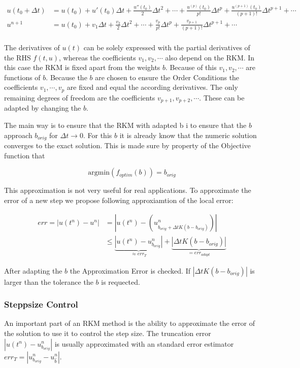 \documentclass{article}
\begin{document}
\begin{align}\label{eq:Taylor_sol_ref}
u(t_0 + \Delta t) &= u(t_0) + u'(t_0) \Delta t + \frac{u''(t_0)}{2} \Delta t^2 + \cdots + \frac{u^{(p)}(t_0)}{p!} \Delta t^p + \frac{u^{(p+1)}(t_0)}{(p+1)!} \Delta t^{p+1} + \cdots \\
u^{n+1} &= u(t_0)  + v_1 \Delta t + \frac{v_2}{2} \Delta t^2 + \cdots + \frac{v_p}{p!} \Delta t^p + \frac{v_{p+1}}{(p+1)!} \Delta t^{p+1} + \cdots \\
\end{align}

The derivatives of $u(t)$ can be solely expressed with the partial derivatives of the RHS $f(t,u)$, whereas the coefficients $v_1,v_2,\cdots$ also depend on the RKM. 
In this case the RKM is fixed apart from the weights $b$. 
Because of this $v_1,v_2,\cdots$ are functions of $b$.
Because the $b$ are chosen to ensure the Order Conditions the coefficients $v_1,\cdots,v_p$ are fixed and equal the according derivatives. 
The only remaining degrees of freedom are the coefficients $v_{p+1},v_{p+2},\cdots$.
These can be adapted by changing the $b$.

The main way is to ensure that the RKM with adapted b i to ensure that the $b$ approach $b_{orig}$ for $\Delta t \to 0$. For this $b$ it is already know that the numeric solution converges to the exact solution.  
This is made sure by property of the Objective function that 

\begin{equation}
\mathrm{argmin}(f_{optim}(b)) = b_{orig}
\end{equation}

This approximation is not very useful for real applications. 
To approximate the error of a new step we propose following approxiamtion of the local error:

\begin{align}
err = |u(t^n)-u^n| &= |u(t^n) - (u^n_{b_{orig}+\Delta t K(b-b_{orig})})| \\
 &\leq \underbrace{|u(t^n)-u^n_{b_{orig}}|}_{\approx err_T}+\underbrace{|\Delta t K(b-b_{orig})|}_{= err_{adapt}}
\end{align}

After adapting the $b$ the Approximation Error is checked. If $|\Delta t K(b-b_{orig})|$ is larger than the tolerance the $b$ is requected. 

\subsubsection{Steppsize Control}
An important part of an RKM method is the ability to approximate the error of the solution to use it to control the step size. 
The truncation error $|u(t^n)-u^n_{b_{orig}}|$ is usually approximated with an standard error estimator $err_T = | u^{n}_{b_{orig}} - u^{n}_{\hat{b}} |$.
\end{document}
